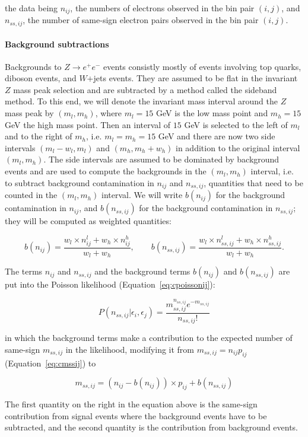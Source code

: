 the data being $n_{ij}$, the numbers of electrons observed in the bin pair
$(i,j)$, and $n_{ss,ij}$, the number of same-sign electron pairs observed in
the bin pair $(i,j)$.

\paragraph{Background subtractions} Backgrounds to $Z\to e^+e^-$ events
consistly mostly of events involving top quarks, diboson events, and $W$+jets
events. They are assumed to be flat in the invariant $Z$ mass peak selection
and are subtracted by a method called the sideband method. To this end, we will
denote the invariant mass interval around the $Z$ mass peak by $(m_l,m_h)$,
where $m_l=15$ GeV is the low mass point and $m_h=15$ GeV the high mass point.
Then an interval of $15$ GeV is selected to the left of $m_l$ and to the right
of $m_h$, i.e. $m_l = m_h = 15$ GeV and there are now two side intervals
$(m_l-w_l, m_l)$ and $(m_h, m_h+w_h)$ in addition to the original interval
$(m_l,m_h)$. The side intervals are assumed to be dominated by background
events and are used to compute the backgrounds in the $(m_l,m_h)$ interval,
i.e. to subtract background contamination in $n_{ij}$ and $n_{ss,ij}$,
quantities that need to be counted in the $(m_l,m_h)$ interval. We will write
$b(n_{ij})$ for the background contamination in $n_{ij}$, and $b(n_{ss,ij})$
for the background contamination in $n_{ss,ij}$; they will be computed as
weighted quantities:

$$
	b(n_{ij}) = \frac{w_l\times n_{ij}^l + w_h\times n_{ij}^h}{w_l + w_h}, \qquad
	b(n_{ss,ij})= \frac{w_l\times n_{ss,ij}^l + w_h \times n_{ss,ij}^h }{w_l + w_h}.
$$

The terms $n_{ij}$ and $n_{ss,ij}$ and the background terms $b(n_{ij})$ and
$b(n_{ss,ij})$ are put into the Poisson likelihood (Equation~\ref{eq:cpoissonij}):

$$
	P(n_{ss,ij} | \epsilon_i, \epsilon_j) = \frac{m_{ss,ij}^{n_{ss,ij}} e^{-m_{ss,ij}}}{n_{ss,ij}!}
$$

in which the background terms make a contribution to the expected number of
same-sign $m_{ss,ij}$ in the likelihood, modifying it from $m_{ss,ij} = n_{ij}
	p_{ij}$ (Equation~\ref{eq:cmssij}) to

$$
	m_{ss,ij} = (n_{ij} - b(n_{ij})) \times p_{ij} + b(n_{ss,ij})
$$

The first quantity on the right in the equation above is the same-sign
contribution from signal events where the background events have to be
subtracted, and the second quantity is the contribution from background events.

